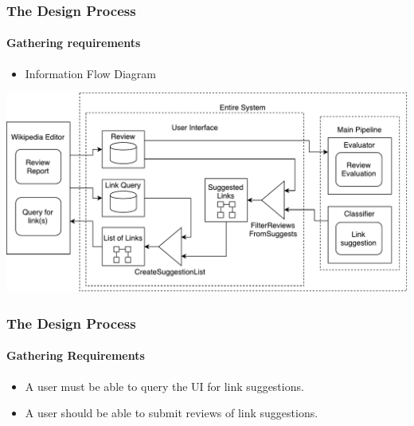 \begin{frame}
    \frametitle{The Design Process}
    \framesubtitle{Gathering requirements}
    \begin{itemize}
    	\item Information Flow Diagram
    \end{itemize}
    \includegraphics[width=\textwidth]{wikiAPI.pdf}
\end{frame}

\begin{frame}
    \frametitle{The Design Process}
    \framesubtitle{Gathering Requirements}
    \begin{itemize}
    	\item A user must be able to query the UI for link suggestions.
    	\item A user should be able to submit reviews of link suggestions.
    \end{itemize}
\end{frame}

